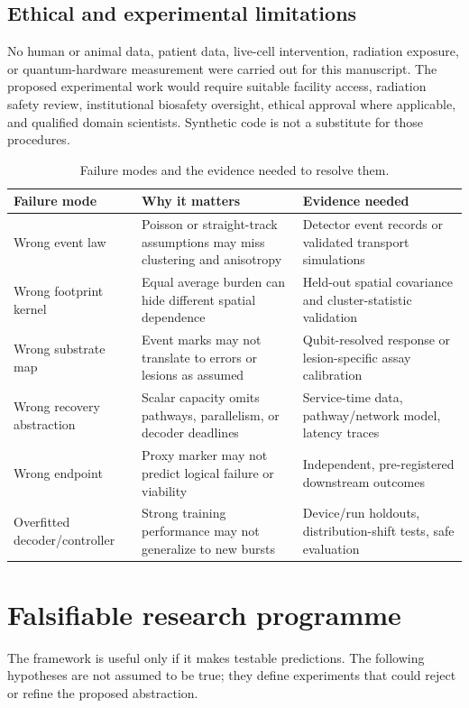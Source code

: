 \documentclass[11pt,a4paper,oneside]{article}
\begin{document}
\subsection{Ethical and experimental limitations}
No human or animal data, patient data, live-cell intervention, radiation exposure, or quantum-hardware measurement were carried out for this manuscript. The proposed experimental work would require suitable facility access, radiation safety review, institutional biosafety oversight, ethical approval where applicable, and qualified domain scientists. Synthetic code is not a substitute for those procedures.

\begin{table}[t]\centering\small\caption{Failure modes and the evidence needed to resolve them.}\label{tab:limitations}\begin{tabularx}{\linewidth}{p{.25\linewidth}X X}\toprule
Failure mode & Why it matters & Evidence needed\\\midrule
Wrong event law & Poisson or straight-track assumptions may miss clustering and anisotropy & Detector event records or validated transport simulations\\
Wrong footprint kernel & Equal average burden can hide different spatial dependence & Held-out spatial covariance and cluster-statistic validation\\
Wrong substrate map & Event marks may not translate to errors or lesions as assumed & Qubit-resolved response or lesion-specific assay calibration\\
Wrong recovery abstraction & Scalar capacity omits pathways, parallelism, or decoder deadlines & Service-time data, pathway/network model, latency traces\\
Wrong endpoint & Proxy marker may not predict logical failure or viability & Independent, pre-registered downstream outcomes\\
Overfitted decoder/controller & Strong training performance may not generalize to new bursts & Device/run holdouts, distribution-shift tests, safe evaluation\\\bottomrule\end{tabularx}\end{table}

\section{Falsifiable research programme}
\label{sec:falsification}
The framework is useful only if it makes testable predictions. The following hypotheses are not assumed to be true; they define experiments that could reject or refine the proposed abstraction.
\end{document}
